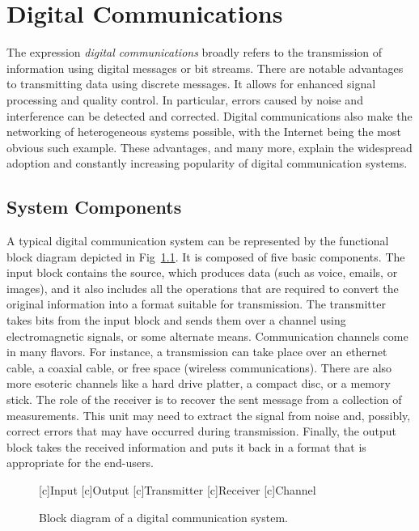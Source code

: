 \chapter{Digital Communications}

The expression \emph{digital communications} broadly refers to the transmission of information using digital messages or bit streams.
There are notable advantages to transmitting data  using discrete messages.
It allows for enhanced signal processing and quality control.
In particular, errors caused by noise and interference can be detected and corrected.
Digital communications also make the networking of heterogeneous systems possible, with the Internet being the most obvious such example.
These advantages, and many more, explain the widespread adoption and constantly increasing popularity of digital communication systems.


\section{System Components}

A typical digital communication system can be represented by the functional block diagram depicted in Fig~\ref{figure:BlockDiagram}.
It is composed of five basic components.
The input block contains the source, which produces data (such as voice, emails, or images), and it also includes all the operations that are required to convert the original information into a format suitable for transmission.
The transmitter takes bits from the input block and sends them over a channel using electromagnetic signals, or some alternate means.
Communication channels come in many flavors.
For instance, a transmission can take place over an ethernet cable, a coaxial cable, or free space (wireless communications).
There are also more esoteric channels like a hard drive platter, a compact disc, or a memory stick.
The role of the receiver is to recover the sent message from a collection of measurements.
This unit may need to extract the signal from noise and, possibly, correct errors that may have occurred during transmission.
Finally, the output block takes the received information and puts it back in a format that is appropriate for the end-users.

\begin{figure}[htbp]
\begin{center}
\begin{psfrags}
[c]{Input}
[c]{Output}
[c]{Transmitter}
[c]{Receiver}
[c]{Channel}
\end{psfrags}
\end{center}
\caption{Block diagram of a digital communication system.}
\label{figure:BlockDiagram}
\end{figure}

